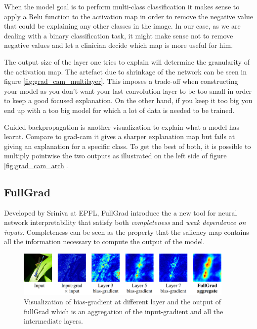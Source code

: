 When the model goal is to perform multi-class classification it makes sense to apply a Relu function to the activation map in order to remove the negative value that could be explaining any other classes in the image. In our case, as we are dealing with a binary classification task, it might make sense not to remove negative values and let a clinician decide which map is more useful for him.

The output size of the layer one tries to explain will determine the granularity of the activation map. The artefact due to shrinkage of the network can be seen in figure \ref{fig:grad_cam_multilayer}. This imposes a trade-off when constructing your model as you don’t want your last convolution layer to be too small in order to keep a good focused explanation. On the other hand, if you keep it too big you end up with a too big model for which a lot of data is needed to be trained.

Guided backpropagation\cite{guided_backprop_springenberg2014striving} is another visualization to explain what a model has learnt. Compare to grad-cam it gives a sharper explanation map but fails at giving an explanation for a specific class. To get the best of both, it is possible to multiply pointwise the two outputs as illustrated on the left side of figure \ref{fig:grad_cam_arch}.


\subsection{FullGrad}

Developed by Sriniva at EPFL, FullGrad\cite{fullgradient} introduce the a new tool for neural network interpretability that satisfy both \textit{completeness} and \textit{weak dependence on inputs}. Completeness can be seen as the property that the saliency map contains all the information necessary to compute the output of the model.

\begin{figure}
    \centering
    \includegraphics[width=400]{figures/fullgrad_layer_agregation.png}
    \caption[FullGradExample]{Visualization\cite{fullgradient} of bias-gradient at different layer and the output of fullGrad which is an aggregation of the input-gradient and all the intermediate layers.}
    \label{fig:full_grad_layer_aggreagtion}
\end{figure}

